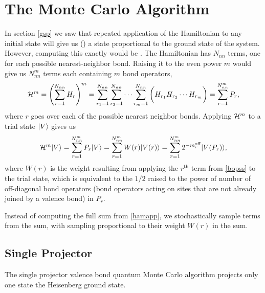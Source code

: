 \section{The Monte Carlo Algorithm}
In section \ref{gsp} we saw that repeated application of the Hamiltonian to any initial state will
give us () a state proportional to the
ground state of the system.
However, computing this exactly would be .
The Hamiltonian has $N_{nn}$ terms, one for each possible nearest-neighbor bond.  
Raising it to the even power $m$ would give us $N_{nn}^m$ terms each containing $m$ bond operators,
\begin{equation} \label{bopss}  
	\mathcal{H}^m=\left(\sum_{r=1}^{N_{nn}}H_r\right)^m=
	\sum_{r_1=1}^{N_{nn}}\sum_{r_2=1}^{N_{nn}}\cdots \sum_{r_m=1}^{N_{nn}}
	\bigg( H_{r_1} H_{r_2} \cdots H_{r_m} \bigg) 
	=\sum_{r=1}^{N_{nn}^m} P_r,
\end{equation}
where $r$ goes over each of the possible nearest neighbor bonds.  
Applying $\mathcal{H}^m$ to a trial state $\lvert {V} \rangle$ gives us
\begin{equation} \label{hamapp}
	\mathcal{H}^m \lvert {V} \rangle = \sum_{r=1}^{N_{nn}^m} P_r \lvert {V} \rangle = \sum_{r=1}^{N_{nn}^m} W(r)\lvert {V(r)} \rangle
	= \sum_{r=1}^{N_{nn}^m} 2^{-m_r^{\text{off}}}\lvert {V(P_r)} \rangle,
\end{equation}
where $W(r)$ is the weight resulting from applying the $r^{\text{th}}$ term from \eqref{bopss} to 
the trial state, which is equivalent to the $1/2$ raised to the power of number of
 off-diagonal bond operators (bond operators
acting on sites that are not already joined by a valence bond) in $P_r$.

Instead of computing the full sum from \eqref{hamapp}, we stochastically sample terms
from the sum, with sampling proportional to their weight $W(r)$ in the sum.





\subsection{Single Projector}
The single projector valence bond quantum Monte Carlo algorithm projects only one state 
the Heisenberg ground state.

